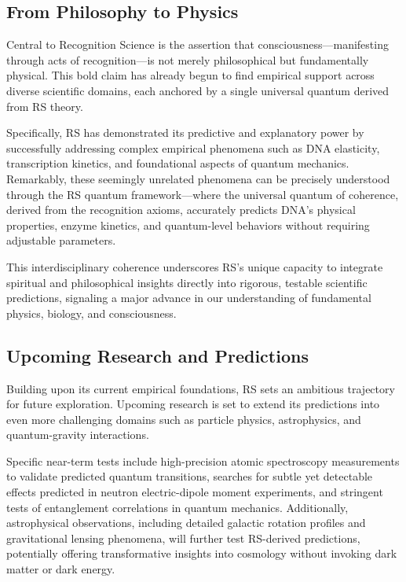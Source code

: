 \documentclass[12pt]{article}
\begin{document}
\subsection{From Philosophy to Physics}

Central to Recognition Science is the assertion that consciousness—manifesting through acts of recognition—is not merely philosophical but fundamentally physical. This bold claim has already begun to find empirical support across diverse scientific domains, each anchored by a single universal quantum derived from RS theory.

Specifically, RS has demonstrated its predictive and explanatory power by successfully addressing complex empirical phenomena such as DNA elasticity, transcription kinetics, and foundational aspects of quantum mechanics. Remarkably, these seemingly unrelated phenomena can be precisely understood through the RS quantum framework—where the universal quantum of coherence, derived from the recognition axioms, accurately predicts DNA’s physical properties, enzyme kinetics, and quantum-level behaviors without requiring adjustable parameters.

This interdisciplinary coherence underscores RS’s unique capacity to integrate spiritual and philosophical insights directly into rigorous, testable scientific predictions, signaling a major advance in our understanding of fundamental physics, biology, and consciousness.

\subsection{Upcoming Research and Predictions}

Building upon its current empirical foundations, RS sets an ambitious trajectory for future exploration. Upcoming research is set to extend its predictions into even more challenging domains such as particle physics, astrophysics, and quantum-gravity interactions.

Specific near-term tests include high-precision atomic spectroscopy measurements to validate predicted quantum transitions, searches for subtle yet detectable effects predicted in neutron electric-dipole moment experiments, and stringent tests of entanglement correlations in quantum mechanics. Additionally, astrophysical observations, including detailed galactic rotation profiles and gravitational lensing phenomena, will further test RS-derived predictions, potentially offering transformative insights into cosmology without invoking dark matter or dark energy.
\end{document}
